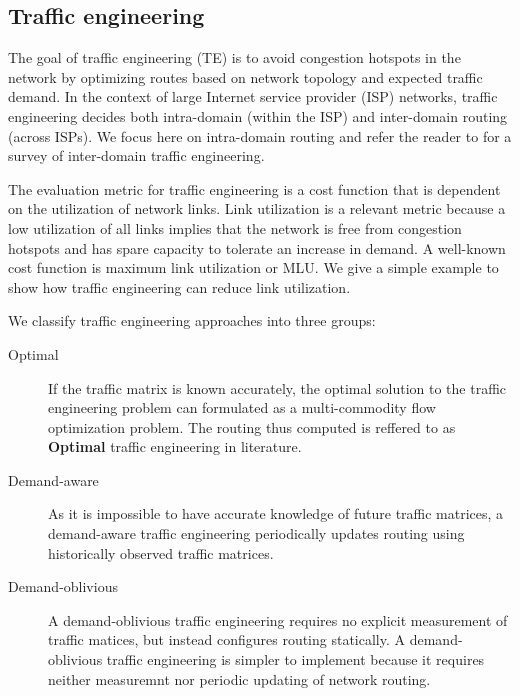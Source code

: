 \subsection{Traffic engineering}
\label{sec:ch2-te}

The goal of traffic engineering (TE)  is to avoid congestion hotspots in the network by optimizing routes based on network topology and expected traffic demand. In the context of large Internet service provider (ISP) networks, traffic engineering decides both intra-domain (within the ISP) and inter-domain routing (across ISPs). We focus here on intra-domain routing and refer the reader to  \cite{Feamster2003,rexford} for a survey of inter-domain traffic engineering. 

The evaluation metric for traffic engineering is a cost function that is dependent on the utilization of network links. Link utilization is a relevant metric because a low utilization of all links implies that the network is free from congestion hotspots and has spare capacity to tolerate an increase in demand. A well-known cost function is maximum link utilization or MLU. We give a simple example to show how traffic engineering can reduce link utilization.


We classify traffic engineering approaches into three groups:
\begin{description}
	\item[Optimal] If the traffic matrix is known accurately, the optimal solution to the traffic engineering problem can formulated as a multi-commodity flow optimization problem. The routing thus computed is reffered to as \textbf{Optimal} traffic engineering in literature.
	\item[Demand-aware] As it is impossible to have accurate knowledge of future traffic matrices, a demand-aware  traffic engineering  periodically updates routing using historically observed traffic matrices.
	\item[Demand-oblivious] A demand-oblivious  traffic engineering  requires no explicit measurement of traffic matices, but instead configures routing statically. A demand-oblivious  traffic engineering  is simpler to implement because it requires neither measuremnt nor periodic updating of network routing. 
	
\end{description}



